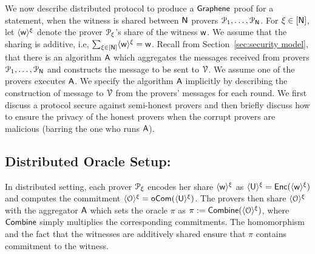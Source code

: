 We now describe distributed protocol to produce a $\textsf{Graphene}$ proof for a
statement, when the witness is shared between $\mathsf{N}$ provers $\mathcal{P}_1,\ldots,\mathcal{P}_{\mathsf{N}}$. For $\xi\in [\mathsf{N}]$,
let $\langle{\mathsf{w}}\rangle^\xi$ denote the prover $\mathcal{P}_\xi$'s share of the witness $\mathsf{w}$.
We assume that the sharing is additive, i.e, $\sum_{\xi\in [\mathsf{N}]} \langle{\mathsf{w}}\rangle^\xi =
\mathsf{w}$. Recall from Section~\ref{sec:security model}, that there is an algorithm $\mathsf{A}$ 
which aggregates the messages received
from provers $\mathcal{P}_1,\ldots,\mathcal{P}_{\mathsf{N}}$ and constructs the message to be
sent to  $\mathcal{V}$. We assume one of the provers executes $\mathsf{A}$.
We specify the algorithm $\mathsf{A}$ implicitly by describing the construction
of message to $\mathcal{V}$ from the provers' messages for each round.
We first discuss a protocol secure against semi-honest provers and then 
briefly discuss how to ensure the privacy of the honest provers when the corrupt 
provers are malicious (barring the one who runs $\mathsf{A}$). 

\subsection{Distributed Oracle Setup:} In distributed setting, each prover
$\mathcal{P}_\xi$ encodes her share $\langle{\mathsf{w}}\rangle^\xi$ as $\langle{\mathsf{U}}\rangle^\xi=\mathsf{Enc}(\langle{\mathsf{w}}\rangle^\xi)$
and computes the commitment $\langle{\mathcal{O}}\rangle^\xi=\mathsf{oCom}(\langle{\mathsf{U}}\rangle^\xi)$. The provers
then share $\langle{\mathcal{O}}\rangle^\xi$ with the aggregator $\mathsf{A}$ which sets the oracle
$\pi$ as $\pi := \mathsf{Combine}(\langle{\mathcal{O}}\rangle^\xi)$, where $\mathsf{Combine}$ simply multiplies the corresponding commitments. The homomorphism and the fact that the witnesses are additively shared ensure that $\pi$ contains commitment to the witness.


